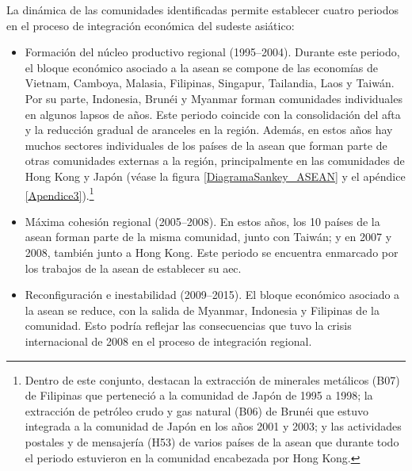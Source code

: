 

La dinámica de las comunidades identificadas permite establecer cuatro periodos en el proceso de integración económica del sudeste asiático:
\begin{itemize}
	\item Formación del núcleo productivo regional (1995--2004).
	Durante este periodo, el bloque económico asociado a la \gls{asean} se compone de las economías de Vietnam, Camboya, Malasia, Filipinas, Singapur, Tailandia, Laos y Taiwán. Por su parte, Indonesia, Brunéi y Myanmar forman comunidades individuales en algunos lapsos de años. Este periodo coincide con la consolidación del \gls{afta} y la reducción gradual de aranceles en la región. Además, en estos años hay muchos sectores individuales de los países de la \gls{asean} que forman parte de otras comunidades externas a la región, principalmente en las comunidades de Hong Kong y Japón (véase la figura \ref{DiagramaSankey_ASEAN} y el apéndice \ref{Apendice3}).\footnote{Dentro de este conjunto, destacan la extracción de minerales metálicos (B07) de Filipinas que perteneció a la comunidad de Japón de 1995 a 1998; la extracción de petróleo crudo y gas natural (B06) de Brunéi que estuvo integrada a la comunidad de Japón en los años 2001 y 2003; y las actividades postales y de mensajería (H53) de varios países de la \gls{asean} que durante todo el periodo estuvieron en la comunidad encabezada por Hong Kong.}
	
	\item Máxima cohesión regional (2005--2008). En estos años, los 10 países de la \gls{asean} forman parte de la misma comunidad, junto con Taiwán; y en 2007 y 2008, también junto a Hong Kong. Este periodo se encuentra enmarcado por los trabajos de la \gls{asean} de establecer su \acrfull{aec}. 
	
	\item Reconfiguración e inestabilidad (2009--2015). El bloque económico asociado a la \gls{asean} se reduce, con la salida de Myanmar, Indonesia y Filipinas de la comunidad. Esto podría reflejar las consecuencias que tuvo la crisis internacional de 2008 en el proceso de integración regional.
	 

\end{itemize}
